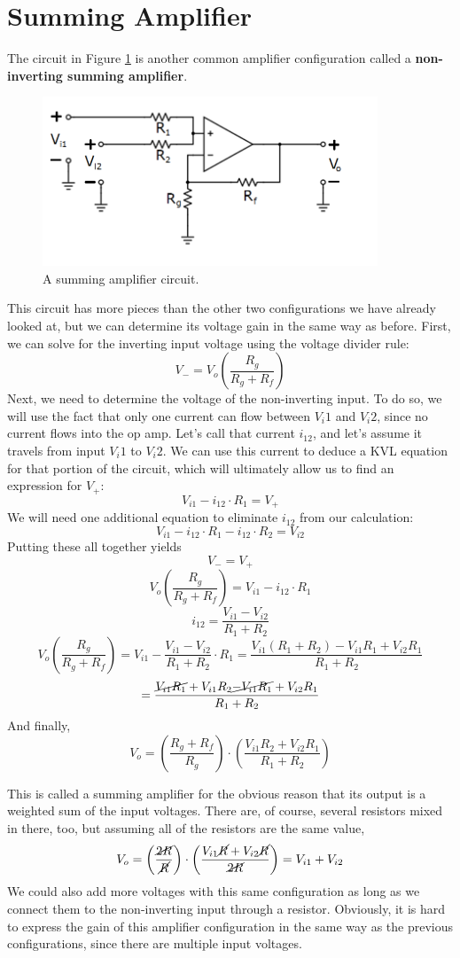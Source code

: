 \section{Summing Amplifier}
The circuit in Figure \ref{summingAmp} is another common amplifier configuration called a \textbf{non-inverting summing amplifier}. 
\begin{figure}[h!]
\centering
\includegraphics[width=10cm]{figures/nonInvertingSummingAmp.png}
\caption{A summing amplifier circuit.}
\label{summingAmp}
\end{figure}
This circuit has more pieces than the other two configurations we have already looked at, but we can determine its voltage gain in the same way as before. First, we can solve for the inverting input voltage using the voltage divider rule:
$$
V_- = V_o\left(\frac{R_g}{R_g+R_f}\right)
$$
Next, we need to determine the voltage of the non-inverting input. To do so, we will use the fact that only one current can flow between $V_i1$ and $V_i2$, since no current flows into the op amp. Let's call that current $i_{12}$, and let's assume it travels from input $V_i1$ to $V_i2$. We can use this current to deduce a KVL equation for that portion of the circuit, which will ultimately allow us to find an expression for $V_+$:
$$
V_{i1}-i_{12}\cdot R_1 = V_+
$$
We will need one additional equation to eliminate $i_{12}$ from our calculation:
$$
V_{i1}-i_{12}\cdot R_1 - i_{12}\cdot R_2 = V_{i2}
$$
Putting these all together yields
$$
V_- = V_+
$$
$$
V_o\left(\frac{R_g}{R_g+R_f}\right) = V_{i1}-i_{12}\cdot R_1
$$
$$
i_{12} = \frac{V_{i1}-V_{i2}}{R_1 + R_2}
$$
$$
V_o\left(\frac{R_g}{R_g+R_f}\right) = V_{i1}-\frac{V_{i1}-V_{i2}}{R_1 + R_2}\cdot R_1 = \frac{V_{i1}(R_1+R_2)-V_{i1}R_1+V_{i2}R_1}{R_1+R_2}
$$
$$
= \frac{\cancel{V_{i1}R_1}+V_{i1}R_2\cancel{-V_{i1}R_1}+V_{i2}R_1}{R_1+R_2}
$$
And finally, 
$$
V_o = \left(\frac{R_g+R_f}{R_g}\right)\cdot\left( \frac{V_{i1}R_2+V_{i2}R_1}{R_1+R_2}\right)
$$
\par
This is called a summing amplifier for the obvious reason that its output is a weighted sum of the input voltages. There are, of course, several resistors mixed in there, too, but assuming all of the resistors are the same value, 
$$
V_o = \left(\frac{\cancel{2R}}{\cancel{R}}\right)\cdot\left( \frac{V_{i1}\cancel{R}+V_{i2}\cancel{R}}{\cancel{2R}}\right) = V_{i1}+V_{i2}
$$
We could also add more voltages with this same configuration as long as we connect them to the non-inverting input through a resistor. Obviously, it is hard to express the gain of this amplifier configuration in the same way as the previous configurations, since there are multiple input voltages.

